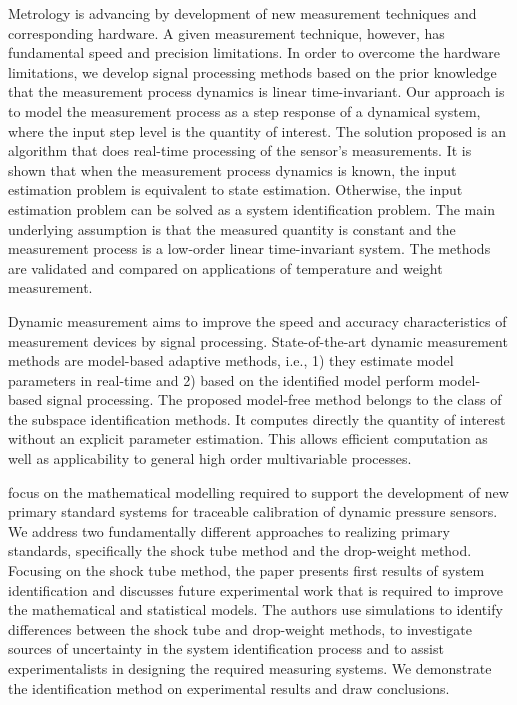 \documentclass[11pt]{article}
\begin{document}
\citet{Markovsky15cep} Metrology is advancing by development of new measurement techniques and corresponding hardware. A given measurement technique, however, has fundamental speed and precision limitations. In order to overcome the hardware limitations, we develop signal processing methods based on the prior knowledge that the measurement process dynamics is linear time-invariant.
Our approach is to model the measurement process as a step response of a dynamical system, where the input step level is the quantity of interest. The solution proposed is an algorithm that does real-time processing of the sensor's measurements. It is shown that when the measurement process dynamics is known, the input estimation problem is equivalent to state estimation. Otherwise, the input estimation problem can be solved as a system identification problem. The main underlying assumption is that the measured quantity is constant and the measurement process is a low-order linear time-invariant system. The methods are validated and compared on applications of temperature and weight measurement.

\citet{Markovsky15ieee} Dynamic measurement aims to improve the speed and accuracy characteristics of measurement devices by signal processing. State-of-the-art dynamic measurement methods are model-based adaptive methods, i.e., 1) they estimate model parameters in real-time and 2) based on the identified model perform model-based signal processing. The proposed model-free method belongs to the class of the subspace identification methods. It computes directly the quantity of interest without an explicit parameter estimation. This allows efficient computation as well as applicability to general high order multivariable processes.



\citet{Matthews14}  focus on the mathematical modelling required to support the development of new primary standard systems for traceable calibration of dynamic pressure sensors. We address two fundamentally different approaches to realizing primary standards, specifically the shock tube method and the drop-weight method. Focusing on the shock tube method, the paper presents first results of system identification and discusses future experimental work that is required to improve the mathematical and statistical models.
The authors use simulations to identify differences between the shock tube and drop-weight methods, to investigate sources of uncertainty in the system identification process and to assist experimentalists in designing the required measuring systems. We demonstrate the identification method on experimental results and draw conclusions.
\end{document}
